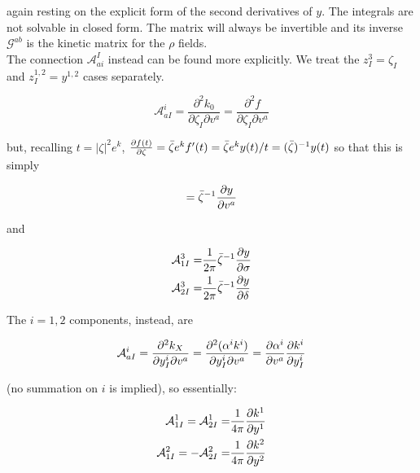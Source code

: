 again resting on the explicit form of the second derivatives of $y$. The integrals are not solvable in closed form. The matrix will always be invertible and its inverse $\mathcal{G}^{ab}$ is the kinetic matrix for the $\rho$ fields.\\

The connection $\mathcal{A}_{ai}^I$ instead can be found more explicitly. We treat the $z_I^3 = \zeta_I$ and $z_I^{1,2} = y^{1,2}$ cases separately.

\begin{equation}
	\mathcal{A}_{aI}^i = \frac{\partial^2 k_0}{\partial \zeta_I \partial v^a} = \frac{\partial^2 f}{\partial \zeta_I \partial v^a}
	\label{}
\end{equation}

but, recalling $t = |\zeta|^2 e^k$, $\frac{\partial f(t)}{\partial\zeta} = \bar \zeta e^k f'(t) =\bar \zeta e^k y(t)/t = (\bar \zeta)^{-1} y(t)$ so that this is simply

\begin{equation}
	= \bar \zeta^{-1} \frac{\partial y}{\partial v^a}	\label{}
\end{equation}

and

\begin{align}
	\mathcal{A}_{1I}^3 =& \frac{1}{2\pi} \bar \zeta^{-1} \frac{\partial y}{\partial\sigma}\\
	\mathcal{A}_{2I}^3 =& \frac{1}{2\pi} \bar \zeta^{-1} \frac{\partial y}{\partial\delta}
	\label{}
\end{align}

The $i=1,2$ components, instead, are

\begin{equation}
	\mathcal{A}_{aI}^i = \frac{\partial^2 k_X}{\partial y_I^i \partial v^a} = \frac{\partial^2 (\alpha^i k^i)}{\partial y_I^i \partial v^a}  = \frac{\partial\alpha^i}{\partial v^a} \frac{\partial k^i}{\partial y_I^i}
	\label{}
\end{equation}

(no summation on $i$ is implied), so essentially:

\begin{align}
	\mathcal{A}_{1I}^1 = \mathcal{A}_{2I}^1 = & \frac{1}{4\pi} \frac{\partial k^1}{\partial y^1} \\
	\mathcal{A}_{1I}^2 = - \mathcal{A}_{2I}^2 = & \frac{1}{4\pi} \frac{\partial k^2}{\partial y^2} \\
	\label{}
\end{align}


